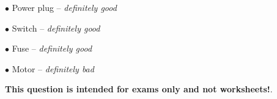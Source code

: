 
\medskip
\item{$\bullet$} Power plug -- {\it definitely good}
\item{$\bullet$} Switch -- {\it definitely good}
\item{$\bullet$} Fuse -- {\it definitely good}
\item{$\bullet$} Motor -- {\it definitely bad}
\medskip







{\bf This question is intended for exams only and not worksheets!}.



